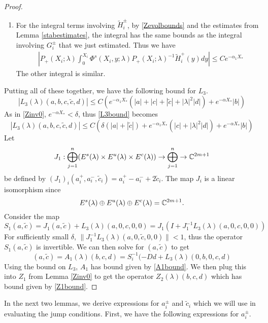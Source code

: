 \documentclass[thesis.tex]{subfiles}
\begin{document}
\begin{lemma}
\begin{proof}
\begin{enumerate}
\item For the integral terms involving $\tilde{H}_i^\pm$, by \eqref{Zevolbounds} and the estimates from Lemma \ref{stabestimates}, the integral has the same bounds as the integral involving $G_i^\pm$ that we just estimated. Thus we have
\begin{align*}
&\left|
P_+(X_i; \lambda) \int_0^{X_i} \Phi^s(X_i, y; \lambda) P_+(X_i; \lambda)^{-1} \tilde{H}_i^+(y) dy \right| \leq C e^{-\alpha_1 X_*} 
\end{align*}
The other integral is similar.
\end{enumerate}

Putting all of these together, we have the following bound for $L_3$.
\begin{equation}\label{L3bound}
|L_3(\lambda)(a, b, c, \tilde{c}, d)| \leq C \left( e^{-\alpha_1 X_*} (|a| + |c| + |\tilde{c}| + |\lambda|^2 |d|) + e^{-\alpha X_*} |b| \right)
\end{equation}
As in \cref{Zinv0}, $e^{-\alpha X_*} < \delta$, thus \cref{L3bound} becomes
\begin{equation*}
|L_3(\lambda)(a, b, c, \tilde{c}, d)| \leq C \left( \delta (|a| + |\tilde{c}|) + e^{-\alpha_1 X_*}(|c| + |\lambda|^2 |d|) + e^{-\alpha X_*} |b| \right)
\end{equation*}
Let 
\[
J_1: \bigoplus_{j=1}^n (E^s(\lambda) \times E^u(
\lambda) \times E^c(\lambda) ) \rightarrow \bigoplus_{j=1}^n \rightarrow \mathbb{C}^{2m+1}
\]
be defined by $(J_1)_i(a_i^+, a_i^-, \tilde{c}_i) = a_i^+ - a_i^- + 2 \tilde{c}_i$. The map $J_i$ is a linear isomorphism since 
\[
E^s(\lambda) \oplus E^u(\lambda) \oplus E^c(\lambda) = \mathbb{C}^{2m+1}.
\]
Consider the map
\[
S_1(a, \tilde{c}) = J_1 (a, \tilde{c}) + L_3(\lambda)(a, 0, c, 0, 0) = J_1( I + J_1^{-1} L_3(\lambda)(a, 0, c, 0, 0))
\]
For sufficiently small $\delta$, $\|J_1^{-1} L_3(\lambda)(a, 0, \tilde{c}, 0, 0)\| < 1$, thus the operator $S_1(a, \tilde{c})$ is invertible. We can then solve for $(a, \tilde{c})$ to get
\[
(a, \tilde{c}) = A_1(\lambda)(b, c, d) = S_i^{-1}(-D d + L_3(\lambda)(0, b, 0, c, d)
\]
Using the bound on $L_3$, $A_1$ has bound given by \cref{A1bound}. We then plug this into $Z_1$ from Lemma \ref{Zinv0} to get the operator $Z_2(\lambda)(b,c,d)$ which has bound given by \cref{Z1bound}.
\end{proof}
\end{lemma}

In the next two lemmas, we derive expressions for $a_i^\pm$ and $\tilde{c}_i$ which we will use in evaluating the jump conditions. First, we have the following expressions for $a_i^\pm$.
\end{document}
